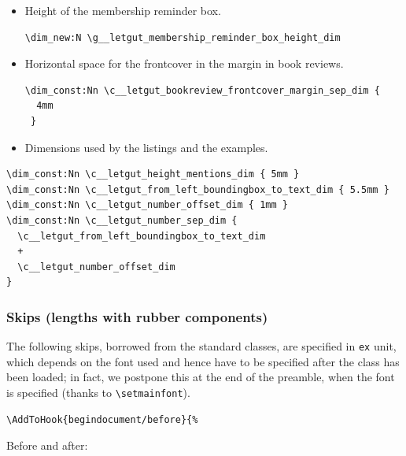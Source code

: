 \documentclass{letgut}
\begin{document}
\begin{itemize}
\begin{itemize}
\begin{lstlisting}
\dim_const:Nn \c__letgut_banner_height_dim  {
  \c__letgut_textheight_dim
  +
  3cm
}
\end{lstlisting}
\end{itemize}
\item Height of the membership reminder box.
\begin{lstlisting}
\dim_new:N \g__letgut_membership_reminder_box_height_dim
\end{lstlisting}
\item Horizontal space for the frontcover in the margin in book reviews.
\begin{lstlisting}
\dim_const:Nn \c__letgut_bookreview_frontcover_margin_sep_dim {
  4mm
 }
\end{lstlisting}
\item Dimensions used by the listings and the examples.
\end{itemize}
\begin{lstlisting}
\dim_const:Nn \c__letgut_height_mentions_dim { 5mm }
\dim_const:Nn \c__letgut_from_left_boundingbox_to_text_dim { 5.5mm }
\dim_const:Nn \c__letgut_number_offset_dim { 1mm }
\dim_const:Nn \c__letgut_number_sep_dim {
  \c__letgut_from_left_boundingbox_to_text_dim
  +
  \c__letgut_number_offset_dim
}
\end{lstlisting}

\subsubsection{Skips (lengths with rubber components)}
\label{sec:orgbda0ae2}

The following skips, borrowed from the standard classes, are specified in
\lstinline+ex+ unit, which depends on the font used and hence have to be specified
after the class has been loaded; in fact, we postpone this at the end of the
preamble, when the font is specified (thanks to \lstinline+\setmainfont+).

\begin{lstlisting}
\AddToHook{begindocument/before}{%
\end{lstlisting}

Before and after:
\end{document}
